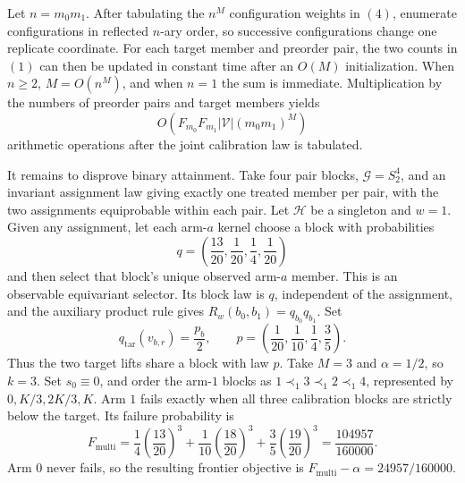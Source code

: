 Let \(n=m_0m_1\). After tabulating the \(n^M\) configuration weights in \((4)\), enumerate configurations in reflected \(n\)-ary order, so successive configurations change one replicate coordinate. For each target member and preorder pair, the two counts in \((1)\) can then be updated in constant time after an \(O(M)\) initialization. When \(n\ge2\), \(M=O(n^M)\), and when \(n=1\) the sum is immediate. Multiplication by the numbers of preorder pairs and target members yields
\[
O\!\left(F_{m_0}F_{m_1}|\mathcal V|(m_0m_1)^M\right)
\tag{5}
\]
arithmetic operations after the joint calibration law is tabulated.

It remains to disprove binary attainment. Take four pair blocks, \(\mathcal G=S_2^4\), and an invariant assignment law giving exactly one treated member per pair, with the two assignments equiprobable within each pair. Let \(\mathcal H\) be a singleton and \(w=1\). Given any assignment, let each arm-\(a\) kernel choose a block with probabilities
\[
q=\left(\frac{13}{20},\frac1{20},\frac14,\frac1{20}\right)
\]
and then select that block's unique observed arm-\(a\) member. This is an observable equivariant selector. Its block law is \(q\), independent of the assignment, and the auxiliary product rule gives \(R_w(b_0,b_1)=q_{b_0}q_{b_1}\). Set
\[
q_{\mathrm{tar}}(v_{b,r})=\frac{p_b}{2},\qquad p=\left(\frac1{20},\frac1{10},\frac14,\frac35\right).
\]
Thus the two target lifts share a block with law \(p\). Take \(M=3\) and \(\alpha=1/2\), so \(k=3\). Set \(s_0\equiv0\), and order the arm-\(1\) blocks as \(1\prec_1 3\prec_1 2\prec_1 4\), represented by \(0,K/3,2K/3,K\). Arm \(1\) fails exactly when all three calibration blocks are strictly below the target. Its failure probability is
\[
F_{\mathrm{multi}}=\frac14\left(\frac{13}{20}\right)^3+\frac1{10}\left(\frac{18}{20}\right)^3+\frac35\left(\frac{19}{20}\right)^3=\frac{104957}{160000}.
\tag{6}
\]
Arm \(0\) never fails, so the resulting frontier objective is \(F_{\mathrm{multi}}-\alpha=24957/160000\).

